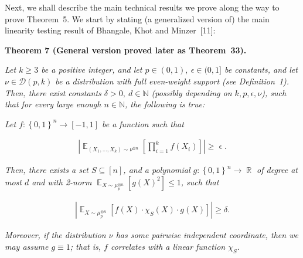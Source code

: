 Next, we shall describe the main technical results we prove along the way to prove Theorem 5.
We start by stating (a generalized version of) the main linearity testing result of Bhangale, Khot and Minzer [11]:\par





\par\medskip\noindent\textbf{
\textbf{Theorem 7}\textbf{ }(General version proved later as Theorem 33)\textbf{.}
}\par



\emph{Let $k\geqslant 3$ be a positive integer, and let $p\in(0,1),\ \epsilon\in(0,1]$ be constants, and let $\nu\in\mathcal{D}(p,k)$ be a distribution with full even-weight support (see Definition 1).
Then, there exist constants $\delta>0,\ d\in\mathbb{N}$ (possibly depending on $k,p,\epsilon,\nu$), such that for every large enough $n\in\mathbb{N}$, the following is true:}\par




\emph{Let $f:\left\{0,1\right\}^{n}\to[-1,1]$ be a function such that}\par


\[\begin{gathered}
\left|\mathop{\mathbb{E}}_{(X_{1},\dots,X_{k})\sim\nu^{\otimes n}}\left[\prod_{i=1}^{k}f(X_{i})\right]\right|\geqslant\mathop{\epsilon}.
\end{gathered}\]


\emph{Then, there exists a set $S\subseteq[n]$, and a polynomial $g:\left\{0,1\right\}^{n}\to\mathop{\mathbb{R}}$ of degree at most $d$ and with 2-norm $\mathop{\mathbb{E}}_{X\sim\mu_{p}^{\otimes n}}\left[g(X)^{2}\right]\leqslant 1$, such that}\par


\[\begin{gathered}
\left|\mathop{\mathbb{E}}_{X\sim\mu_{p}^{\otimes n}}\left[f(X)\cdot\chi_{S}(X)\cdot g(X)\right]\right|\geqslant\delta.
\end{gathered}\]




\emph{Moreover, if the distribution $\nu$ has some pairwise independent coordinate, then we may assume $g\equiv 1$; that is, $f$ correlates with a linear function $\chi_{S}$.}\par






